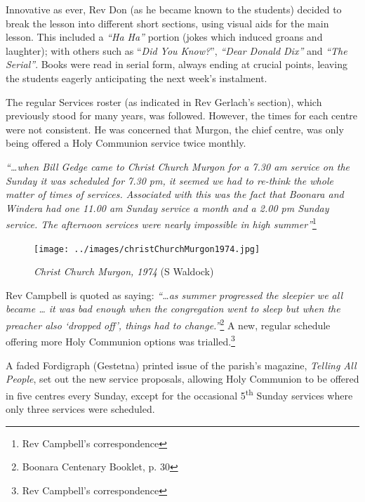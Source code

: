 Innovative as ever, Rev Don (as he became known to the students) decided to break the lesson into different short sections, using visual aids for the main lesson. This included a \emph{``Ha Ha''} portion (jokes which induced groans and laughter); with others such as ``\emph{Did You Know?}'', \emph{``Dear Donald Dix''} and \emph{``The Serial''}. Books were read in serial form, always ending at crucial points, leaving the students eagerly anticipating the next week's instalment.



The regular Services roster (as indicated in Rev Gerlach's section), which previously stood for many years, was followed. However, the times for each centre were not consistent. He was concerned that Murgon, the chief centre, was only being offered a Holy Communion service twice monthly.



\emph{``\ldots when Bill Gedge came to Christ Church Murgon for a 7.30 am service on the Sunday it was scheduled for 7.30 pm, it seemed we had to re-think the whole matter of times of services. Associated with this was the fact that Boonara and Windera had one 11.00 am Sunday service a month and a 2.00 pm Sunday service. The afternoon services were nearly impossible in high summer''}\footnote{Rev Campbell's correspondence}








\begin{figure}
\begin{center}
\texttt{[image: ../images/christChurchMurgon1974.jpg]}
\caption{{\itshape Christ Church Murgon, 1974} {\scriptsize(S Waldock)}}
\end{center}
\end{figure}




Rev Campbell is quoted as saying: \emph{``\ldots as summer progressed the sleepier we all became \ldots{} it was bad enough when the congregation went to sleep but when the preacher also `dropped off', things had to change.''}\footnote{Boonara Centenary Booklet, p. 30} A new, regular schedule offering more Holy Communion options was trialled.\footnote{Rev Campbell's correspondence}


A faded Fordigraph (Gestetna) printed issue of the parish's magazine, \emph{Telling All People}, set out the new service proposals, allowing Holy Communion to be offered in five centres every Sunday, except for the occasional 5\textsuperscript{th} Sunday services where only three services were scheduled.



